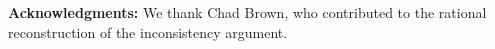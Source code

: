 \documentclass{llncs}
\begin{document}
\noindent\textbf{Acknowledgments:} We thank Chad Brown, who contributed to the rational  reconstruction
of the inconsistency argument.

\pagebreak







\small


\end{document}

